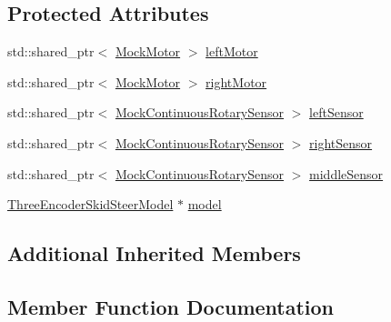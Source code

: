 \subsection*{Protected Attributes}
\begin{DoxyCompactItemize}
\item 
std\+::shared\+\_\+ptr$<$ \mbox{\hyperlink{classokapi_1_1MockMotor}{Mock\+Motor}} $>$ \mbox{\hyperlink{classThreeEncoderSkidSteerModelTest_a2ae0bf5282ae4426b9ec8c82fed14aaf}{left\+Motor}}
\item 
std\+::shared\+\_\+ptr$<$ \mbox{\hyperlink{classokapi_1_1MockMotor}{Mock\+Motor}} $>$ \mbox{\hyperlink{classThreeEncoderSkidSteerModelTest_a15e3686caca6777c3ff4a9592a6c659b}{right\+Motor}}
\item 
std\+::shared\+\_\+ptr$<$ \mbox{\hyperlink{classokapi_1_1MockContinuousRotarySensor}{Mock\+Continuous\+Rotary\+Sensor}} $>$ \mbox{\hyperlink{classThreeEncoderSkidSteerModelTest_a113c7d6bc8fdada082d5ee8d5e4f8c75}{left\+Sensor}}
\item 
std\+::shared\+\_\+ptr$<$ \mbox{\hyperlink{classokapi_1_1MockContinuousRotarySensor}{Mock\+Continuous\+Rotary\+Sensor}} $>$ \mbox{\hyperlink{classThreeEncoderSkidSteerModelTest_a5768a2d7bc5bc6896dc466f4da108b55}{right\+Sensor}}
\item 
std\+::shared\+\_\+ptr$<$ \mbox{\hyperlink{classokapi_1_1MockContinuousRotarySensor}{Mock\+Continuous\+Rotary\+Sensor}} $>$ \mbox{\hyperlink{classThreeEncoderSkidSteerModelTest_a5f1750d17b50fd1c844324c015273340}{middle\+Sensor}}
\item 
\mbox{\hyperlink{classokapi_1_1ThreeEncoderSkidSteerModel}{Three\+Encoder\+Skid\+Steer\+Model}} $\ast$ \mbox{\hyperlink{classThreeEncoderSkidSteerModelTest_adbca69458d1eac7543b28202a1683a89}{model}}
\end{DoxyCompactItemize}
\subsection*{Additional Inherited Members}


\subsection{Member Function Documentation}
\mbox{\label{classThreeEncoderSkidSteerModelTest_a1f737d5acfc0a34821a47d3ea5498fc1}} 
